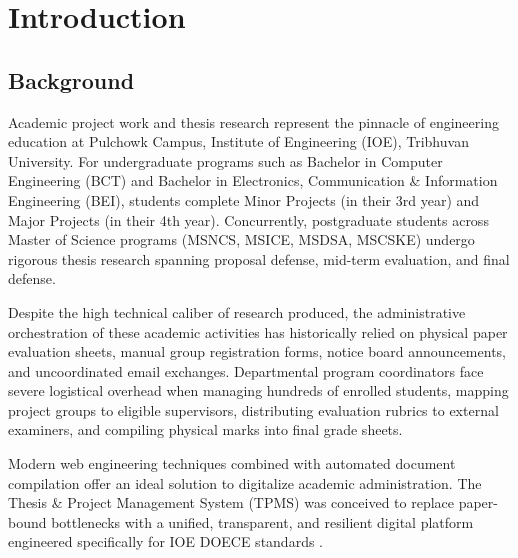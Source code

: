 \documentclass[12pt]{report}
\begin{document}
\chapter{Introduction}

\section{Background}
Academic project work and thesis research represent the pinnacle of engineering education at Pulchowk Campus, Institute of Engineering (IOE), Tribhuvan University. For undergraduate programs such as Bachelor in Computer Engineering (BCT) and Bachelor in Electronics, Communication \& Information Engineering (BEI), students complete Minor Projects (in their 3rd year) and Major Projects (in their 4th year). Concurrently, postgraduate students across Master of Science programs (MSNCS, MSICE, MSDSA, MSCSKE) undergo rigorous thesis research spanning proposal defense, mid-term evaluation, and final defense.

Despite the high technical caliber of research produced, the administrative orchestration of these academic activities has historically relied on physical paper evaluation sheets, manual group registration forms, notice board announcements, and uncoordinated email exchanges. Departmental program coordinators face severe logistical overhead when managing hundreds of enrolled students, mapping project groups to eligible supervisors, distributing evaluation rubrics to external examiners, and compiling physical marks into final grade sheets.

Modern web engineering techniques combined with automated document compilation offer an ideal solution to digitalize academic administration. The Thesis \& Project Management System (TPMS) was conceived to replace paper-bound bottlenecks with a unified, transparent, and resilient digital platform engineered specifically for IOE DOECE standards \citep{pressman2014software}.
\end{document}
